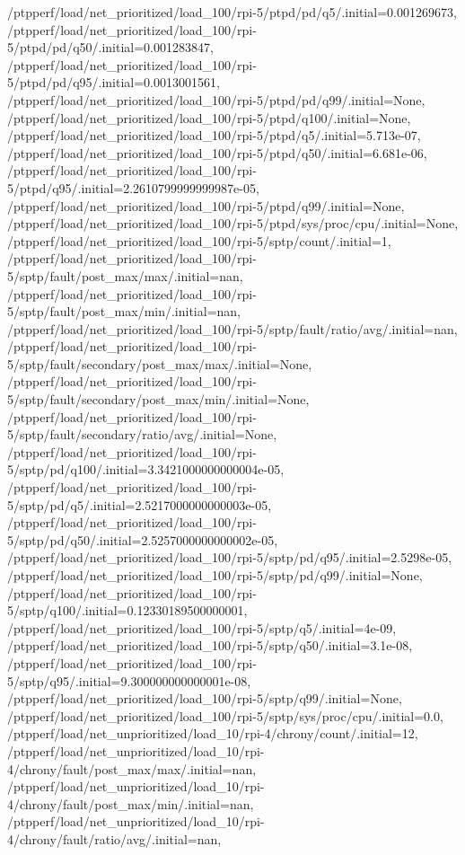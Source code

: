 {    /ptpperf/load/net_prioritized/load_100/rpi-5/ptpd/pd/q5/.initial=0.001269673,
    /ptpperf/load/net_prioritized/load_100/rpi-5/ptpd/pd/q50/.initial=0.001283847,
    /ptpperf/load/net_prioritized/load_100/rpi-5/ptpd/pd/q95/.initial=0.0013001561,
    /ptpperf/load/net_prioritized/load_100/rpi-5/ptpd/pd/q99/.initial=None,
    /ptpperf/load/net_prioritized/load_100/rpi-5/ptpd/q100/.initial=None,
    /ptpperf/load/net_prioritized/load_100/rpi-5/ptpd/q5/.initial=5.713e-07,
    /ptpperf/load/net_prioritized/load_100/rpi-5/ptpd/q50/.initial=6.681e-06,
    /ptpperf/load/net_prioritized/load_100/rpi-5/ptpd/q95/.initial=2.2610799999999987e-05,
    /ptpperf/load/net_prioritized/load_100/rpi-5/ptpd/q99/.initial=None,
    /ptpperf/load/net_prioritized/load_100/rpi-5/ptpd/sys/proc/cpu/.initial=None,
    /ptpperf/load/net_prioritized/load_100/rpi-5/sptp/count/.initial=1,
    /ptpperf/load/net_prioritized/load_100/rpi-5/sptp/fault/post_max/max/.initial=nan,
    /ptpperf/load/net_prioritized/load_100/rpi-5/sptp/fault/post_max/min/.initial=nan,
    /ptpperf/load/net_prioritized/load_100/rpi-5/sptp/fault/ratio/avg/.initial=nan,
    /ptpperf/load/net_prioritized/load_100/rpi-5/sptp/fault/secondary/post_max/max/.initial=None,
    /ptpperf/load/net_prioritized/load_100/rpi-5/sptp/fault/secondary/post_max/min/.initial=None,
    /ptpperf/load/net_prioritized/load_100/rpi-5/sptp/fault/secondary/ratio/avg/.initial=None,
    /ptpperf/load/net_prioritized/load_100/rpi-5/sptp/pd/q100/.initial=3.3421000000000004e-05,
    /ptpperf/load/net_prioritized/load_100/rpi-5/sptp/pd/q5/.initial=2.5217000000000003e-05,
    /ptpperf/load/net_prioritized/load_100/rpi-5/sptp/pd/q50/.initial=2.5257000000000002e-05,
    /ptpperf/load/net_prioritized/load_100/rpi-5/sptp/pd/q95/.initial=2.5298e-05,
    /ptpperf/load/net_prioritized/load_100/rpi-5/sptp/pd/q99/.initial=None,
    /ptpperf/load/net_prioritized/load_100/rpi-5/sptp/q100/.initial=0.12330189500000001,
    /ptpperf/load/net_prioritized/load_100/rpi-5/sptp/q5/.initial=4e-09,
    /ptpperf/load/net_prioritized/load_100/rpi-5/sptp/q50/.initial=3.1e-08,
    /ptpperf/load/net_prioritized/load_100/rpi-5/sptp/q95/.initial=9.300000000000001e-08,
    /ptpperf/load/net_prioritized/load_100/rpi-5/sptp/q99/.initial=None,
    /ptpperf/load/net_prioritized/load_100/rpi-5/sptp/sys/proc/cpu/.initial=0.0,
    /ptpperf/load/net_unprioritized/load_10/rpi-4/chrony/count/.initial=12,
    /ptpperf/load/net_unprioritized/load_10/rpi-4/chrony/fault/post_max/max/.initial=nan,
    /ptpperf/load/net_unprioritized/load_10/rpi-4/chrony/fault/post_max/min/.initial=nan,
    /ptpperf/load/net_unprioritized/load_10/rpi-4/chrony/fault/ratio/avg/.initial=nan,
}
